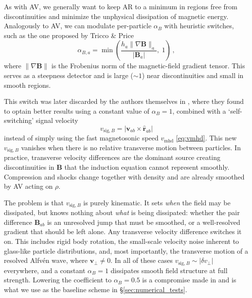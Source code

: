 As with AV, we generally want to keep AR to a minimum in regions free from discontinuities and minimize the unphysical dissipation of magnetic energy. Analogously to AV, we can modulate per-particle $\alpha_B$ with heuristic switches, such as the one proposed by Tricco \& Price \cite{TriccoPrice2013}
\begin{equation}
    \alpha_{B,a} = \min\!\left(\frac{h_a \|\nabla \mathbf{B}\|_a}{|\mathbf{B}_a|},\; 1\right)\,,
    \label{eq:tp_switch}
\end{equation}
where $\|\nabla \mathbf{B}\|$ is the Frobenius norm of the magnetic-field gradient tensor. This serves as a steepness detector and is large ($\sim 1$) near discontinuities and small in smooth regions.

This switch was later discarded by the authors themselves in \cite{Price2018}, where they found to optain better results using a constant value of $\alpha_B=1$, combined with a `self-switching' signal velocity
\begin{equation}
    v_{\mathrm{sig},B} = |\mathbf{v}_{ab} \times \hat{\mathbf{r}}_{ab}|
    \label{eq:vsigB}
\end{equation}
instead of simply using the fast magnetosonic speed $v_\mathrm{mhd}$ \eqref{eq:vmhd}. This new $v_{\mathrm{sig},B}$ vanishes when there is no relative transverse motion between particles. In practice, transverse velocity differences are the dominant source creating discontinuities in $\mathbf{B}$ that the induction equation cannot represent smoothly. Compression and shocks change together with density and are already smoothed by AV acting on $\rho$. 

The problem is that $v_{\mathrm{sig},B}$ is purely kinematic. It sets \emph{when} the field may be dissipated, but knows nothing about \emph{what} is being dissipated: whether the pair difference $\mathbf{B}_{ab}$ is an unresolved jump that must be smoothed, or a well-resolved gradient that should be left alone. Any transverse velocity difference switches it on. This includes rigid body rotation, the small-scale velocity noise inherent to glass-like particle distributions, and, most importantly, the transverse motion of a resolved Alfvén wave, where $\mathbf{v}_\perp \neq 0$. In all of these cases $v_{\mathrm{sig},B} \sim |\delta v_\perp|$ everywhere, and a constant $\alpha_B = 1$ dissipates smooth field structure at full strength. Lowering the coefficient to $\alpha_B = 0.5$ is a compromise made in \cite{WissingShen2020} and is what we use as the baseline scheme in §\ref{sec:numerical_tests}.

